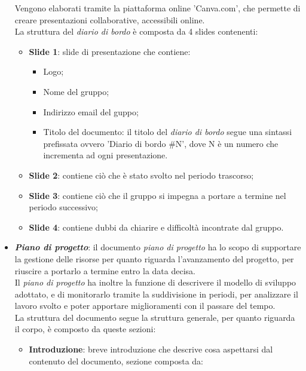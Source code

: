 \begin{itemize}
            Vengono elaborati tramite la piattaforma online 'Canva.com', che permette di creare presentazioni collaborative, accessibili online.\\ 
            La struttura del \textit{diario di bordo} è composta da 4 slides contenenti:
            \begin{itemize}
                \item \textbf{Slide 1}: slide di presentazione che contiene:
                \begin{itemize}
                    \item Logo;
                    \item Nome del gruppo;
                    \item Indirizzo email del guppo;
                    \item Titolo del documento: il titolo del \textit{diario di bordo} segue una sintassi prefissata ovvero 'Diario di bordo \#N', dove N è un numero che incrementa ad ogni presentazione.
                \end{itemize}
                \item \textbf{Slide 2}: contiene ciò che è stato svolto nel periodo trascorso;
                \item \textbf{Slide 3}: contiene ciò che il gruppo si impegna a portare a termine nel periodo successivo;
                \item \textbf{Slide 4}: contiene dubbi da chiarire e difficoltà incontrate dal gruppo.
            \end{itemize}
            \item \textit{\textbf{Piano di progetto}}: il documento \textit{piano di progetto} ha lo scopo di supportare la gestione delle risorse per quanto riguarda l'avanzamento del progetto, per riuscire a portarlo a termine entro la data decisa.\\
            Il \textit{piano di progetto} ha inoltre la funzione di descrivere il modello di sviluppo adottato, e di monitorarlo tramite la suddivisione in periodi, per analizzare il lavoro svolto e poter apportare miglioramenti con il passare del tempo.
            \\La struttura del documento segue la struttura generale, per quanto riguarda il corpo, è composto da queste sezioni:
            \begin{itemize}
                \item \textbf{Introduzione}: breve introduzione che descrive cosa aspettarsi dal contenuto del documento, sezione composta da:

\end{itemize}
\end{itemize}
